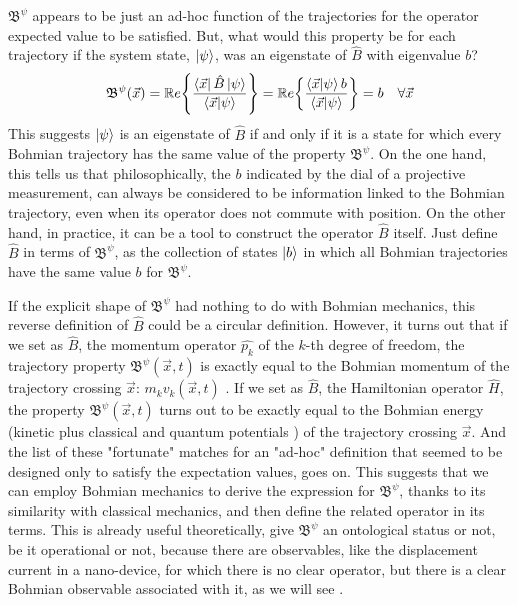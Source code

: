 \documentclass[11pt, a4paper]{article} %
\newcommand{\B}{\mathfrak{B}}
\begin{document}
$\B^\psi$ appears to be just an ad-hoc function of the trajectories for the operator expected value to be satisfied. But, what would this property be for each trajectory if the system state, $\ket{\psi}$, was an eigenstate of $\hat{B}$ with eigenvalue $b$?
\begin{equation}
\B^\psi(\vec{x})=\mathbb{R}e\qty{ \frac{\bra{\vec{x}}\hat{B}\ket{\psi}}{\bra{\vec{x}}\ket{\psi}} } = \mathbb{R}e\qty{ \frac{\bra{\vec{x}}\ket{\psi}b}{\bra{\vec{x}}\ket{\psi}} }=b\quad \forall \vec{x}
\end{equation}
This suggests $\ket{\psi}$ is an eigenstate of $\hat{B}$ if and only if it is a state for which every Bohmian trajectory has the same value of the property $\B^\psi$. On the one hand, this tells us that philosophically, the $b$ indicated by the dial of a projective measurement, can always be considered to be information linked to the Bohmian trajectory, even when its operator does not commute with position. On the other hand, in practice, it can be a tool to construct the operator $\hat{B}$ itself. Just define $\hat{B}$ in terms of $\B^\psi$, as the collection of states $\ket{b}$ in which all Bohmian trajectories have the same value $b$ for $\B^\psi$.

If the explicit shape of $\B^\psi$ had nothing to do with Bohmian mechanics, this reverse definition of $\hat{B}$ could be a circular definition. However, it turns out that if we set as $\hat{B}$, the momentum operator $\hat{p_k}$ of the $k$-th degree of freedom, the trajectory property $\B^\psi(\vec{x},t)$ is exactly equal to the Bohmian momentum of the trajectory crossing $\vec{x}$: $m_k v_k(\vec{x},t)$ \cite{DevInPosition1}. If we set as $\hat{B}$, the Hamiltonian operator $\hat{H}$, the property $\B^\psi(\vec{x},t)$ turns out to be exactly equal to the Bohmian energy (kinetic plus classical and quantum potentials \cite{JordiXavier}) of the trajectory crossing $\vec{x}$. And the list of these "fortunate" matches for an "ad-hoc" definition that seemed to be designed only to satisfy the expectation values, goes on. This suggests that we can employ Bohmian mechanics to derive the expression for $\B^\psi$, thanks to its similarity with classical mechanics, and then define the related operator in its terms. This is already useful theoretically, give $\B^\psi$ an ontological status or not, be it operational or not, because there are observables, like the displacement current in a nano-device, for which there is no clear operator, but there is a clear Bohmian observable associated with it, as we will see \cite{Pel, equiv}.
\end{document}
